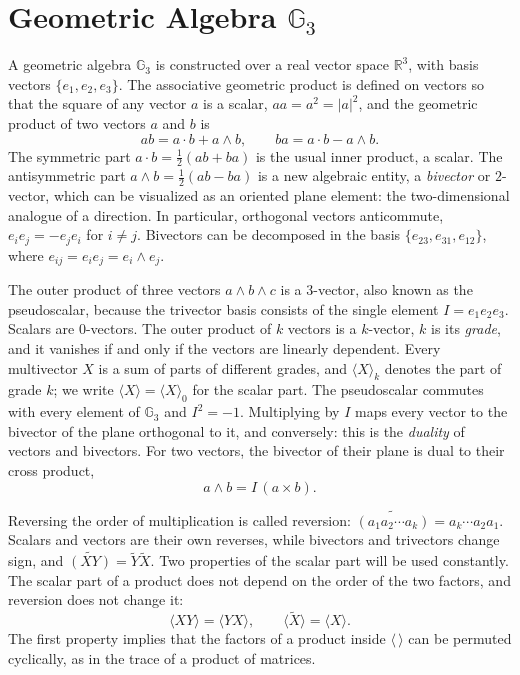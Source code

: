 \documentclass{birkjour}
\theoremstyle{definition}
\theoremstyle{remark}
\numberwithin{equation}{section}
\newcommand{\rev}[1]{\widetilde{#1}}
\newcommand{\grade}[2]{\langle #1 \rangle_{#2}}
\newcommand{\scal}[1]{\langle #1 \rangle}
\newcommand{\Ge}{\mathbb{G}}
\newcommand{\R}{\mathbb{R}}
\begin{document}
\section{Geometric Algebra $\Ge_3$}

A geometric algebra $\Ge_3$ is constructed over a real vector space $\R^3$, with basis vectors $\{e_1, e_2, e_3\}$. The associative geometric product is defined on vectors so that the square of any vector $a$ is a scalar, $a a = a^2 = |a|^2$, and the geometric product of two vectors $a$ and $b$ is
\begin{equation}
\label{eqn:gp}
a b = a \cdot b + a \wedge b, \qquad b a = a \cdot b - a \wedge b.
\end{equation}
The symmetric part $a \cdot b = \frac{1}{2}(a b + b a)$ is the usual inner product, a scalar. The antisymmetric part $a \wedge b = \frac{1}{2}(a b - b a)$ is a new algebraic entity, a \emph{bivector} or $2$-vector, which can be visualized as an oriented plane element: the two-dimensional analogue of a direction. In particular, orthogonal vectors anticommute, $e_i e_j = -e_j e_i$ for $i \neq j$. Bivectors can be decomposed in the basis $\{e_{23}, e_{31}, e_{12}\}$, where $e_{ij} = e_i e_j = e_i \wedge e_j$.

The outer product of three vectors $a \wedge b \wedge c$ is a $3$-vector, also known as the pseudoscalar, because the trivector basis consists of the single element $I = e_1 e_2 e_3$. Scalars are $0$-vectors. The outer product of $k$ vectors is a $k$-vector, $k$ is its \emph{grade}, and it vanishes if and only if the vectors are linearly dependent. Every multivector $X$ is a sum of parts of different grades, and $\grade{X}{k}$ denotes the part of grade $k$; we write $\scal{X} = \grade{X}{0}$ for the scalar part. The pseudoscalar commutes with every element of $\Ge_3$ and $I^2 = -1$. Multiplying by $I$ maps every vector to the bivector of the plane orthogonal to it, and conversely: this is the \emph{duality} of vectors and bivectors. For two vectors, the bivector of their plane is dual to their cross product,
\begin{equation}
\label{eqn:wedge_cross}
a \wedge b = I\, (a \times b).
\end{equation}

Reversing the order of multiplication is called reversion: $\rev{(a_1 a_2 \cdots a_k)} = a_k \cdots a_2 a_1$. Scalars and vectors are their own reverses, while bivectors and trivectors change sign, and $\rev{(X Y)} = \rev{Y} \rev{X}$. Two properties of the scalar part will be used constantly. The scalar part of a product does not depend on the order of the two factors, and reversion does not change it:
\begin{equation}
\label{eqn:cyclic}
\scal{X Y} = \scal{Y X}, \qquad \scal{\rev{X}} = \scal{X}.
\end{equation}
The first property implies that the factors of a product inside $\scal{\,}$ can be permuted cyclically, as in the trace of a product of matrices.
\end{document}
